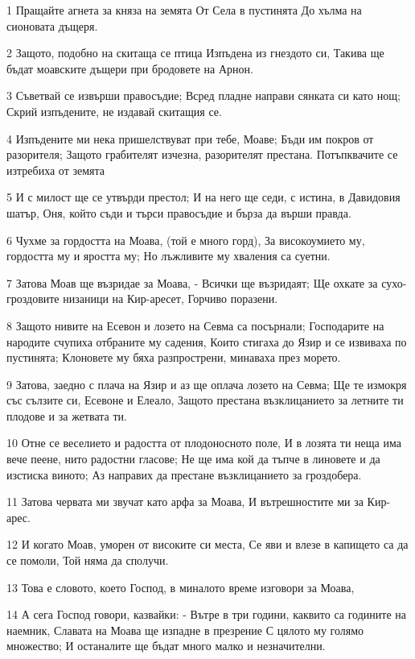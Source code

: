 \par 1 Пращайте агнета за княза на земята От Села в пустинята До хълма на сионовата дъщеря.
\par 2 Защото, подобно на скитаща се птица Изпъдена из гнездото си, Такива ще бъдат моавските дъщери при бродовете на Арнон.
\par 3 Съветвай се извърши правосъдие; Всред пладне направи сянката си като нощ; Скрий изпъдените, не издавай скитащия се.
\par 4 Изпъдените ми нека пришелствуват при тебе, Моаве; Бъди им покров от разорителя; Защото грабителят изчезна, разорителят престана. Потъпквачите се изтребиха от земята
\par 5 И с милост ще се утвърди престол; И на него ще седи, с истина, в Давидовия шатър, Оня, който съди и търси правосъдие и бърза да върши правда.
\par 6 Чухме за гордостта на Моава, (той е много горд), За високоумието му, гордостта му и яростта му; Но лъжливите му хваления са суетни.
\par 7 Затова Моав ще възридае за Моава, - Всички ще възридаят; Ще охкате за сухо-гроздовите низаници на Кир-аресет, Горчиво поразени.
\par 8 Защото нивите на Есевон и лозето на Севма са посърнали; Господарите на народите счупиха отбраните му садения, Които стигаха до Язир и се извиваха по пустинята; Клоновете му бяха разпрострени, минаваха през морето.
\par 9 Затова, заедно с плача на Язир и аз ще оплача лозето на Севма; Ще те измокря със сълзите си, Есевоне и Елеало, Защото престана възклицанието за летните ти плодове и за жетвата ти.
\par 10 Отне се веселието и радостта от плодоносното поле, И в лозята ти неща има вече пеене, нито радостни гласове; Не ще има кой да тъпче в линовете и да изстиска виното; Аз направих да престане възклицанието за гроздобера.
\par 11 Затова червата ми звучат като арфа за Моава, И вътрешностите ми за Кир-арес.
\par 12 И когато Моав, уморен от високите си места, Се яви и влезе в капището са да се помоли, Той няма да сполучи.
\par 13 Това е словото, което Господ, в миналото време изговори за Моава,
\par 14 А сега Господ говори, казвайки: - Вътре в три години, каквито са годините на наемник, Славата на Моава ще изпадне в презрение С цялото му голямо множество; И останалите ще бъдат много малко и незначителни.

